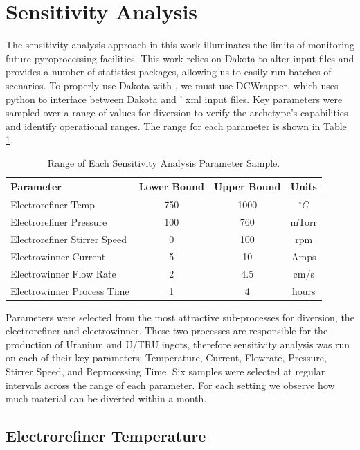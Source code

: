 \section{Sensitivity Analysis}

The sensitivity analysis approach in this work illuminates the limits of monitoring future pyroprocessing facilities. This work relies on Dakota to alter \Cyclus input files and provides a number of statistics packages, allowing us to easily
run batches of scenarios. To properly use Dakota with \Cyclus, we must use DCWrapper, which uses python to interface between Dakota and \Cyclus' xml input files. 
Key parameters were sampled over a range of values for diversion to verify the archetype's capabilities and identify operational ranges. The range for each parameter is shown in Table \ref{tab:range}. 

\begin{table}[h]
	\centering
	\begin{tabularx}{\linewidth}{lccc}
		\hline
		\textbf{Parameter} & \textbf{Lower Bound} & \textbf{Upper Bound} & \textbf{Units} \\
		\hline \hline
		Electrorefiner Temp & 750 & 1000 & $^\circ C$ \\ \hline
		Electrorefiner Pressure & 100 & 760 & mTorr \\ \hline
		Electrorefiner Stirrer Speed & 0 & 100 & rpm \\ \hline
		Electrowinner Current & 5 & 10 & Amps \\ \hline
		Electrowinner Flow Rate & 2 & 4.5 & cm/s \\ \hline
		Electrowinner Process Time & 1 & 4 & hours \\ \hline
	\end{tabularx}
	\caption {Range of Each Sensitivity Analysis Parameter Sample.}
	\label {tab:range}
\end{table}

Parameters were selected from the most attractive
sub-processes for diversion, the electrorefiner and electrowinner. These two processes are responsible for the production of Uranium and U/TRU ingots, therefore sensitivity analysis was run
on each of their key parameters: Temperature, Current, Flowrate, Pressure, Stirrer Speed, and Reprocessing Time. Six samples were selected at regular intervals across the range of each parameter. For each setting we observe how much material can be diverted within a month.

\subsection{Electrorefiner Temperature}

